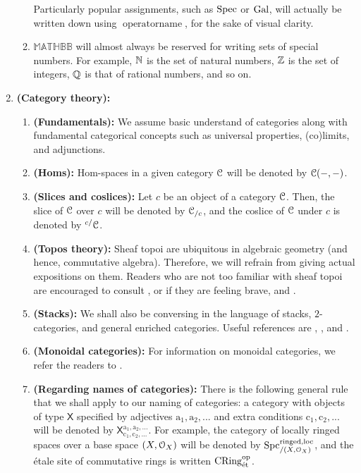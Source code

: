 \begin{enumerate}
\begin{enumerate}
                Particularly popular assignments, such as $\operatorname{Spec}$ or $\mathrm{Gal}$, will actually be written down using $\operatorname{operatorname}$, for the sake of visual clarity.
                \item $\mathbb{MATHBB}$ will almost always be reserved for writing sets of special numbers. For example, $\mathbb{N}$ is the set of natural numbers, $\mathbb{Z}$ is the set of integers, $\mathbb{Q}$ is that of rational numbers, and so on. 
            \end{enumerate}
        \item \textbf{(Category theory):} 
            \begin{enumerate}
                \item \textbf{(Fundamentals):} We assume basic understand of categories along with fundamental categorical concepts such as universal properties, (co)limits, and adjunctions. 
                \item \textbf{(Homs):} Hom-spaces in a given category $\mathcal{C}$ will be denoted by $\mathcal{C}(-, -)$.
                \item \textbf{(Slices and coslices):} Let $c$ be an object of a category $\mathcal{C}$. Then, the slice of $\mathcal{C}$ over $c$ will be denoted by $\mathcal{C}_{/c}$, and the coslice of $\mathcal{C}$ under $c$ is denoted by ${}^{c/}\mathcal{C}$. 
                \item \textbf{(Topos theory):} Sheaf topoi are ubiquitous in algebraic geometry (and hence, commutative algebra). Therefore, we will refrain from giving actual expositions on them. Readers who are not too familiar with sheaf topoi are encouraged to consult \cite{sga4}, or if they are feeling brave, \cite{elephant1} and \cite{elephant2}. 
                \item \textbf{(Stacks):} We shall also be conversing in the language of stacks, $2$-categories, and general enriched categories. Useful references are \cite{vistoli_descent}, \cite{leinster_higher_categories}, and \cite{kelly_enriched_categories}.
                \item \textbf{(Monoidal categories):} For information on monoidal categories, we refer the readers to \cite{EGNO}.
                \item \textbf{(Regarding names of categories):} There is the following general rule that we shall apply to our naming of categories: a category with objects of type $\mathsf{X}$ specified by adjectives $\mathrm{a_1, a_2, ...}$ and extra conditions $\mathrm{c_1, c_2, ...}$ will be denoted by $\mathsf{X}^{\mathrm{a_1, a_2, ...}}_{\mathrm{c_1, c_2, ...}}$. For example, the category of locally ringed spaces over a base space $(X, \mathcal{O}_X)$ will be denoted by $\mathrm{Spc}^{\mathrm{ringed}, \mathrm{loc}}_{/(X, \mathcal{O}_X)}$, and the \'etale site of commutative rings is written $\mathrm{CRing}^{\mathrm{op}}_{\mathrm{\acute{e}t}}$. 

\end{enumerate}
\end{enumerate}

